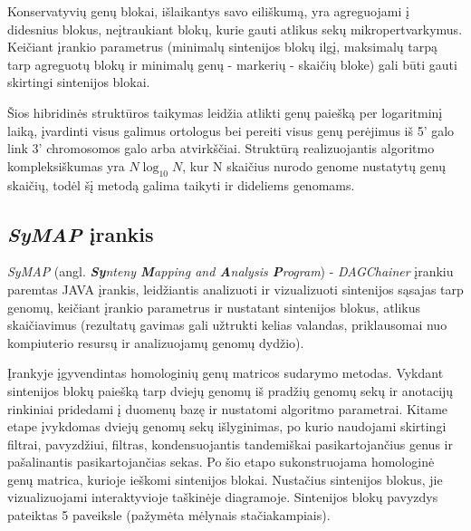 \documentclass[12pt]{article}
\begin{document}
Konservatyvių genų blokai, išlaikantys savo eiliškumą, yra agreguojami į
didesnius blokus, neįtraukiant blokų, kurie gauti atlikus sekų
mikropertvarkymus. Keičiant įrankio parametrus (minimalų sintenijos blokų
ilgį, maksimalų tarpą tarp agreguotų blokų ir minimalų genų - markerių - skaičių
bloke) gali būti gauti skirtingi sintenijos blokai.

Šios hibridinės struktūros taikymas leidžia atlikti genų paiešką per logaritminį
laiką, įvardinti visus galimus ortologus bei pereiti visus genų perėjimus iš 5'
galo link 3' chromosomos galo arba atvirkščiai. Struktūrą realizuojantis
algoritmo kompleksiškumas yra $ N\log_{10}N $, kur N skaičius nurodo genome
nustatytų genų skaičių, todėl šį metodą galima taikyti ir dideliems genomams.

\subsection{\emph{SyMAP} įrankis}
\emph{SyMAP}\cite{SYMAP} (angl. \emph{\textbf{Sy}nteny \textbf{M}apping and
\textbf{A}nalysis \textbf{P}rogram}) - \emph{DAGChainer} įrankiu paremtas JAVA
įrankis, leidžiantis analizuoti ir vizualizuoti sintenijos sąsajas tarp genomų,
keičiant įrankio parametrus ir nustatant sintenijos blokus, atlikus skaičiavimus
(rezultatų gavimas gali užtrukti kelias valandas, priklausomai nuo kompiuterio
resursų ir analizuojamų genomų dydžio).

Įrankyje įgyvendintas homologinių genų matricos sudarymo metodas. Vykdant
sintenijos blokų paiešką tarp dviejų genomų iš pradžių genomų sekų ir anotacijų
rinkiniai pridedami į duomenų bazę ir nustatomi algoritmo parametrai. Kitame
etape įvykdomas dviejų genomų sekų išlyginimas, po kurio naudojami skirtingi
filtrai, pavyzdžiui, filtras, kondensuojantis tandemiškai pasikartojančius
genus ir pašalinantis pasikartojančias sekas. Po šio etapo sukonstruojama
homologinė genų matrica, kurioje ieškomi sintenijos blokai. Nustačius sintenijos
blokus, jie vizualizuojami interaktyvioje taškinėje diagramoje. Sintenijos blokų
pavyzdys pateiktas 5 paveiksle (pažymėta mėlynais stačiakampiais).
\end{document}
